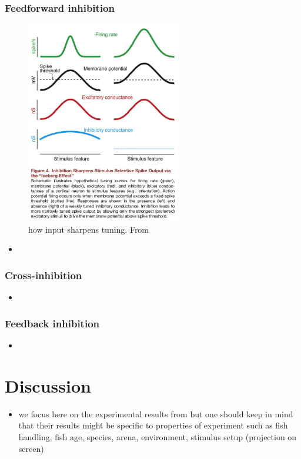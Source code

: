 \documentclass[a4paper,10pt,hidelinks]{scrreprt}
\begin{document}
	\subsection{Feedforward inhibition}
	\begin{figure}[H]
		\centering
		\includegraphics[width=0.6\textwidth, 
		height=0.4\textheight]{../figures/isaacson2001_figure4.jpg}
		\caption{how input sharpens tuning. From \cite{Isaacson2011}}
		\label{fig:feedf}
	\end{figure}
	\begin{itemize}
		\item 
	\end{itemize}
	\subsection{Cross-inhibition}
	\begin{itemize}
		\item 
	\end{itemize}
	\subsection{Feedback inhibition}
	\begin{itemize}
		\item 
	\end{itemize}
	\chapter{Discussion}
	\begin{itemize}
		\item we focus here on the experimental results from 
		\cite{Bhattacharyya2017} but one should keep in mind that their results 
		might be specific to properties of experiment such as fish handling, 
		fish age, species, arena, environment, stimulus setup (projection on 
		screen)
	\end{itemize}
	\newpage
	
	
	
\end{document}
